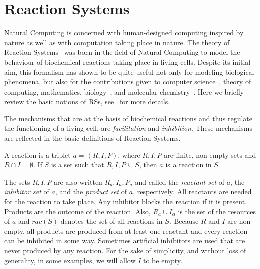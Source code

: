 
\section{Reaction Systems}
\label{sec:rs}

Natural Computing is concerned with human-designed computing inspired by 
nature as well as with computation taking place in nature.
The theory of Reaction Systems~\cite{BEMR11} 
was born in the field of Natural Computing 
to model the behaviour of biochemical reactions taking place in living cells. 
Despite its initial aim, this formalism has shown to be quite useful 
not only for modeling biological phenomena, but also for
the contributions given to computer science~\cite{MPR15}, 
theory of computing, 
mathematics, biology~\cite{ABP14,CMMBM12,Az17,BarbutiGLM16}, 
and molecular chemistry~\cite{OY16}.
%
Here we briefly review the basic notions of RSs, see~\cite{BEMR11} for more details.

The mechanisms that are at the basis of biochemical reactions and thus 
regulate the functioning of a living cell, are 
{\em facilitation} and {\em inhibition}. These mechanisms are 
reflected in the basic definitions of Reaction Systems.

\begin{definition}[Reaction]
A reaction is a triplet $a = (R,I,P)$, where $R, I, P$ are finite,  
non empty sets  and
$R \cap I = \emptyset$. If $S$ is a set such that  $R, I, P \subseteq S$, 
then $a$ is a reaction in $S$.
\end{definition}

The sets $R, I, P$ are also written $R_a, I_a, P_a$ and called the 
\emph{reactant set} of $a$, the  
\emph{inhibitor set} of $a$, and the \emph{product set} of $a$, respectively. 
All reactants are needed for the reaction to take place.
Any inhibitor blocks the reaction if it is present. Products are the outcome of the reaction.
Also,  $R_a \cup I_a$ is the set of the resources of $a$ and $ rac(S)$
denotes the set of all reactions in $S$.
%
Because $R$ and $I$ are non empty, all products are produced from at least one reactant and every reaction can be inhibited in some way. 
Sometimes artificial inhibitors are used that are never produced by any reaction.
For the sake of simplicity,  and without loss of generality, in some examples, we will allow $I$ to be empty.

